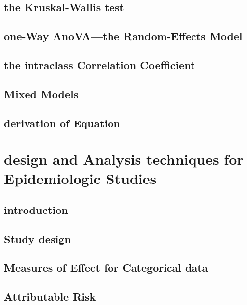 \documentclass[12pt,]{article}
\theoremstyle{definition}
\theoremstyle{definition}
\theoremstyle{definition}
\theoremstyle{remark}
\begin{document}
\subsection{the Kruskal-Wallis test}\label{the-kruskal-wallis-test}

\subsection{one-Way AnoVA---the Random-Effects
Model}\label{one-way-anovathe-random-effects-model}

\subsection{the intraclass Correlation
Coefficient}\label{the-intraclass-correlation-coefficient}

\subsection{Mixed Models}\label{mixed-models}

\subsection{derivation of Equation}\label{derivation-of-equation}

\section{design and Analysis techniques for Epidemiologic
Studies}\label{design-and-analysis-techniques-for-epidemiologic-studies}

\subsection{introduction}\label{introduction-10}

\subsection{Study design}\label{study-design}

\subsection{Measures of Effect for Categorical
data}\label{measures-of-effect-for-categorical-data}

\subsection{Attributable Risk}\label{attributable-risk}
\end{document}
